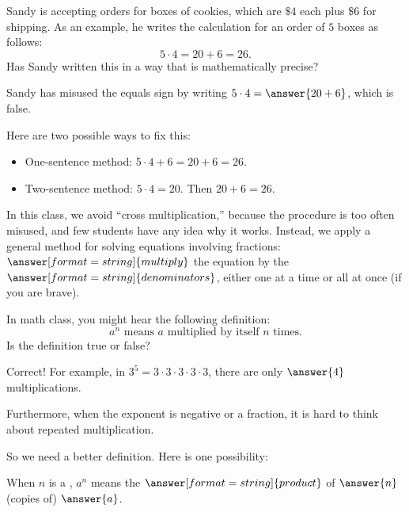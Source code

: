 \documentclass[nooutcomes]{ximera}
\begin{document}
\begin{problem}
Sandy is accepting orders for boxes of cookies, which are $\$4$ each plus $\$6$ for shipping.  As an example, he writes the calculation for an order of $5$ boxes as follows: 
\[
5\cdot 4 = 20 + 6 = 26.
\]
Has Sandy written this in a way that is mathematically precise?  
\begin{multipleChoice}
\end{multipleChoice}
\begin{problem}
Sandy has misused the equals sign by writing $5\cdot 4 = \answer{20 + 6}$, which is false.  

Here are two possible ways to fix this: 
\begin{itemize}
\item One-sentence method: $5\cdot 4 + 6 = 20 + 6 = 26$.
\item Two-sentence method: $5\cdot 4 = 20$.  Then $20 + 6 = 26$.
\end{itemize}
\end{problem}
\end{problem}

\begin{problem}
In this class, we avoid ``cross multiplication,'' because the procedure is too often misused, and few students have any idea why it works.  Instead, we apply a general method for solving equations involving fractions: $\answer[format=string]{multiply}$ the equation by the $\answer[format=string]{denominators}$, either one at a time or all at once (if you are brave).  
\end{problem}

\begin{problem}
In math class, you might hear the following definition:  
\[
a^n\text{ means }a\text{ multiplied by itself }n\text{ times.}  
\]
Is the definition true or false?  
\begin{multipleChoice}
\end{multipleChoice}
\begin{problem}
Correct!  For example, in $3^5=3\cdot3\cdot3\cdot3\cdot3$, there are only $\answer{4}$ multiplications.  

Furthermore, when the exponent is negative or a fraction, it is hard to think about repeated multiplication.  

So we need a better definition.  Here is one possibility: 

When $n$ is a , $a^n$ means the $\answer[format=string]{product}$ of $\answer{n}$ (copies of) $\answer{a}$.
\end{problem}
\end{problem}
\end{document}
